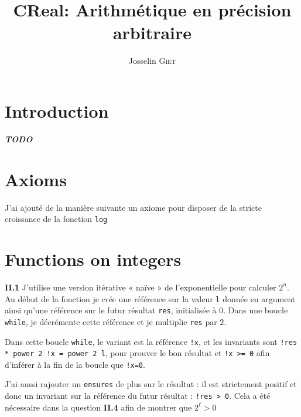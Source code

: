 \documentclass[9pt,a4paper,twocolumn]{article}
\title{CReal: Arithmétique en précision arbitraire}   %
\author{Josselin \textsc{Giet}}  %
\theoremstyle{definition}
\newcommand{\TODO}{{\color{red}\textbf{\textit{TODO}}}}
\newenvironment{code}[1][ocaml]{%
\newgeometry{textwidth = 0.8\textwidth}
\VerbatimEnvironment\begin{verbatim}%
}{%
\end{verbatim}
\restoregeometry
}
\begin{document}
\maketitle

\section*{Introduction}
\TODO
\tableofcontents
\listoflistings

\section{Axioms}


J'ai ajouté de la manière suivante un axiome pour disposer de la stricte
croissance de la fonction \texttt{log}

\section{Functions on integers}

\textbf{II.1}
J'utilise une version itérative « naïve » de l'exponentielle pour
calculer $2^n$. Au début de la fonction je crée une référence sur la valeur
\texttt{l} donnée en argument ainsi qu'une référence sur le futur résultat
\texttt{res}, initialisée à 0. Dans une boucle \texttt{while}, je décrémente
cette référence et je multiplie \texttt{res} par $2$.

Dans cette boucle \texttt{while}, le variant est la référence \texttt{!x},
et les invariants sont \texttt{!res * power 2 !x = power 2 l}, pour prouver
le bon résultat et \texttt{!x >= 0} afin d'inférer à la fin de la boucle que
\texttt{!x=0}.


J'ai aussi rajouter un \texttt{ensures} de plus sur le résultat :
il est strictement positif et donc un invariant sur la référence du futur
résultat : \texttt{!res > 0}.
Cela a été nécessaire dans la question \textbf{II.4} afin de montrer que
$2^\ell > 0$
\end{document}

